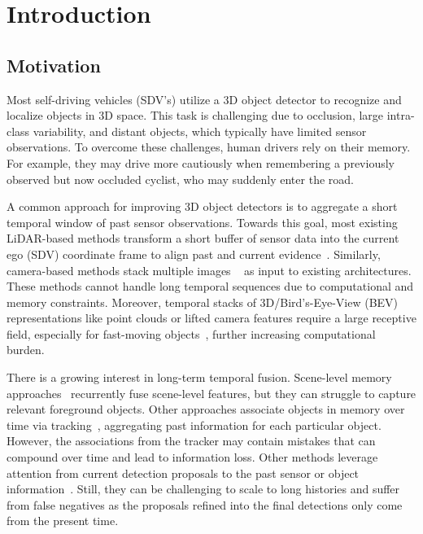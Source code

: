 \chapter{Introduction}
\label{sec:intro}



\section{Motivation}

Most self-driving vehicles (SDV's) utilize a 3D object detector to recognize and localize objects in 3D space.
This task is challenging due to occlusion, large intra-class variability, and distant objects, which typically have limited sensor observations.
To overcome these challenges, human drivers rely on their memory.
For example, they may drive more cautiously when remembering a previously observed but now occluded cyclist, who may suddenly enter the road.
\renewcommand{\thefootnote}{\fnsymbol{footnote}}
\renewcommand{\thefootnote}{\arabic{footnote}}

A common approach for improving 3D object detectors is to aggregate a short temporal window of past sensor observations.
Towards this goal, most existing LiDAR-based methods transform a short buffer of sensor data into the current ego (SDV) coordinate frame
to align past and current evidence~\cite{caesar2020nuscenes,sun2022swformer,yang20213d,centerpoint,luo2018fast}. Similarly, camera-based methods stack multiple images ~\cite{zeng2022lift,piergiovanni20214d} as input to existing architectures.
These methods cannot handle long temporal sequences due to computational and memory constraints.
Moreover, temporal stacks of 3D/Bird's-Eye-View (BEV) representations
like point clouds or lifted camera features require a large receptive field,
especially for fast-moving objects~\cite{li2023modar}, further increasing computational burden.

There is a growing interest in long-term temporal fusion.
Scene-level memory approaches~\cite{he2023lef,li2022bevformer,frossard2021strobe}
recurrently fuse scene-level features,
but they can struggle to capture relevant foreground objects.
Other approaches associate objects in memory over time via tracking~\cite{liang2020pnpnet,chen2022mppnet,li2023modar,huang2024ptt}, aggregating past information for each particular object.
However, the associations from the tracker may contain mistakes that can compound over time and lead to information loss. 
Other methods leverage attention from current detection proposals to the past sensor or object information~\cite{he2023msf,yang20213d,hou2024query}. Still, they can be challenging to scale to long histories and suffer from false negatives as the proposals refined into the final detections only come from the present time.


